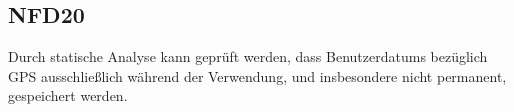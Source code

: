 \subsection*{NFD20}
Durch \gls{statische Analyse} kann geprüft werden, dass \Glspl{Benutzerdatum} bezüglich \Gls{GPS} ausschließlich während der Verwendung, und insbesondere nicht permanent, gespeichert werden.